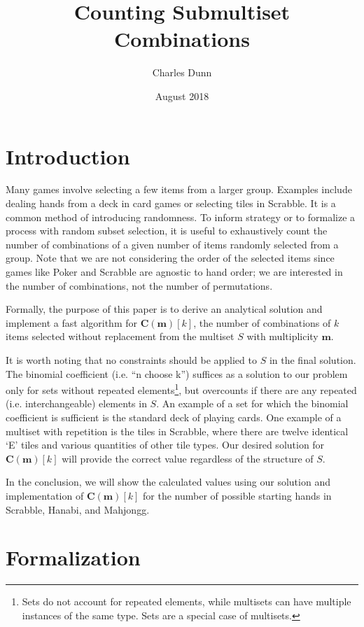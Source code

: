 \documentclass{article}
\title{Counting Submultiset Combinations}
\author{Charles Dunn}
\date{August 2018}
\begin{document}
\maketitle

\section{Introduction}

Many games involve selecting a few items from a larger group. Examples include dealing hands from a deck in card games or selecting tiles in Scrabble. It is a common method of introducing randomness. To inform strategy or to formalize a process with random subset selection, it is useful to exhaustively count the number of combinations of a given number of items randomly selected from a group. Note that we are not considering the order of the selected items since games like Poker and Scrabble are agnostic to hand order; we are interested in the number of combinations, not the number of permutations.

Formally, the purpose of this paper is to derive an analytical solution and implement a fast algorithm for $\bm{C}(\bm{m})[k]$, the number of combinations of $k$ items selected without replacement from the multiset $S$ with multiplicity $\bm{m}$. 

It is worth noting that no constraints should be applied to $S$ in the final solution. The binomial coefficient (i.e. ``n choose k'') suffices as a solution to our problem only for sets without repeated elements\footnote{Sets do not account for repeated elements, while multisets can have multiple instances of the same type. Sets are a special case of multisets.}, but overcounts if there are any repeated (i.e. interchangeable) elements in $S$. An example of a set for which the binomial coefficient is sufficient is the standard deck of playing cards. One example of a multiset with repetition is the tiles in Scrabble, where there are twelve identical `E' tiles and various quantities of other tile types. Our desired solution for $\bm{C}(\bm{m})[k]$ will provide the correct value regardless of the structure of $S$.

In the conclusion, we will show the calculated values using our solution and implementation of $\bm{C}(\bm{m})[k]$ for the number of possible starting hands in Scrabble, Hanabi, and Mahjongg.

\section{Formalization}
\end{document}
